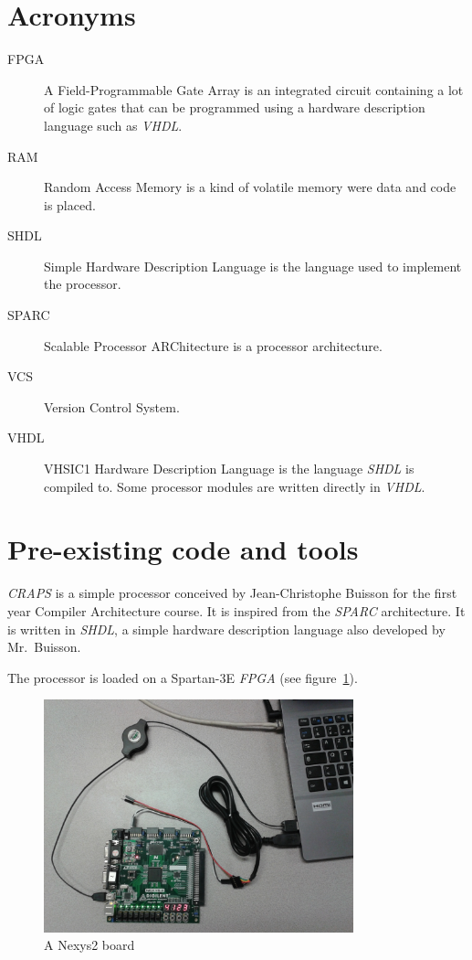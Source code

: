 \documentclass[openany, a4paper]{book}
\begin{document}
    \section{Acronyms}
      \begin{description}
        \item[FPGA] A Field-Programmable Gate Array is an integrated circuit
          containing a lot of logic gates that can be programmed using a
          hardware description language such as \emph{VHDL}.
        \item[RAM] Random Access Memory is a kind of volatile memory were data
          and code is placed.
        \item[SHDL] Simple Hardware Description Language is the language used to
          implement the processor.
        \item[SPARC] Scalable Processor ARChitecture is a processor
          architecture.
        \item[VCS] Version Control System.
        \item[VHDL] VHSIC1 Hardware Description Language is the language
          \emph{SHDL} is compiled to. Some processor modules are written
          directly in \emph{VHDL}.
      \end{description}

    \section{Pre-existing code and tools}
      \emph{CRAPS} is a simple processor conceived by Jean-Christophe Buisson
      for the first year Compiler Architecture course. It is inspired from the
      \emph{SPARC} architecture. It is written in \emph{SHDL}, a simple hardware
      description language also developed by Mr.\ Buisson.

      The processor is loaded on a Spartan-3E \emph{FPGA} (see
      figure~\ref{fig:nexys}).

      \begin{figure}[h]
        \centering
        \includegraphics[width=0.8\textwidth]{./fig/Nexys2.jpg}
        \caption{A Nexys2 board}
        \label{fig:nexys}
      \end{figure}
\end{document}
